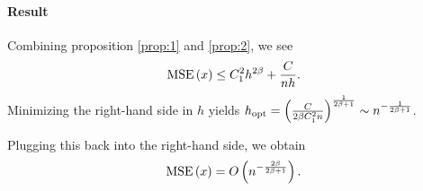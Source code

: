 \paragraph{Result}
Combining proposition \ref{prop:1} and \ref{prop:2}, we see
\begin{equation*}
  \mathrm{MSE} \left(x\right)\leq C_1^2 h^{2\beta} + \frac{C}{nh}.
\end{equation*}
Minimizing the right-hand side in $h$ yields $h_{\mathrm{opt}}= \left(\frac{C}{2\beta C_1^2 n}\right)^{\frac{1}{2\beta +1}}\sim n^{-\frac{1}{2\beta +1}}$.

Plugging this back into the right-hand side, we obtain
\begin{equation*}
  \mathrm{MSE}\left(x\right) = O\left(n^{-\frac{2\beta}{2\beta+1}}\right).
\end{equation*}
